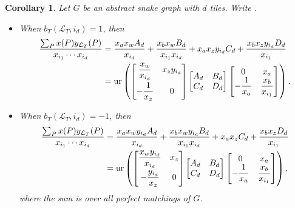 \documentclass[pdftex]{sigma}
\numberwithin{equation}{section}
\newtheorem{Corollary}[Theorem]{Corollary}
\theoremstyle{definition}
\begin{document}
\begin{Corollary}
Let $G$ be an abstract snake graph with $d$ tiles. Write .
\begin{itemize}\itemsep=0pt
\item When $b_{T}(\mathcal{L}_{T}, i_{d})=1$, then
\begin{align*}
\frac{\sum_P x(P)y_{\mathcal{L}_T}(P)}{x_{i_1}\cdots x_{i_d}}&=\frac{x_a x_w A_d}{x_{i_d}}+\frac{x_b x_w B_d}{x_{i_1} x_{i_d}}+x_{a} x_z y_{i_d}C_d+\frac{x_b x_z y_{i_d}D_d}{x_{i_1}}\nonumber\\
&=\operatorname{ur}\left(\begin{bmatrix}
\dfrac{x_w}{x_{i_d}} & x_{z}y_{i_d}\vspace{1mm}\\
-\dfrac{1}{x_{z}} & 0
\end{bmatrix}
\begin{bmatrix}
A_d & B_d\\
C_d & D_d
\end{bmatrix}
\begin{bmatrix}
0 &x_a\\
-\dfrac{1}{x_a} & \dfrac{x_b}{x_{i_1}}
\end{bmatrix}\right).%
\end{align*}

\item When $b_{T}(\mathcal{L}_{T}, i_{d})=-1$, then
\begin{align*}
\frac{\sum_P x(P)y_{\mathcal{L}_T}(P)}{x_{i_1}\cdots x_{i_d}}&=\frac{x_a x_w y_{i_d} A_d}{x_{i_d}}+\frac{x_b x_w y_{i_d} B_d}{x_{i_1} x_{i_d}}+x_{a} x_z C_d+\frac{x_b x_z D_d}{x_{i_1}}\\
&=\operatorname{ur}\left(\begin{bmatrix}
\dfrac{x_w y_{i_d}}{x_{i_d}} & x_{z}\vspace{1mm}\\
-\dfrac{y_{i_d}}{x_{z}} & 0
\end{bmatrix}
\begin{bmatrix}
A_d & B_d\\
C_d & D_d
\end{bmatrix}
\begin{bmatrix}
0 & x_a\\
-\dfrac{1}{x_a} & \dfrac{x_b}{x_{i_1}}
\end{bmatrix}\right), %
\end{align*}
where the sum is over all perfect matchings of $G$.
\end{itemize}
\end{Corollary}
\end{document}

